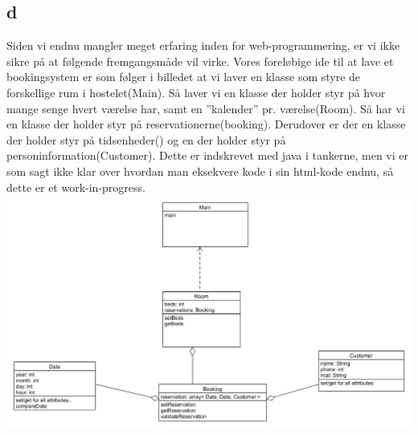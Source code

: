 \documentclass[12pt,a4paper]{article}
\begin{document}
\subsection{d}
Siden vi endnu mangler meget erfaring inden for web-programmering, er vi ikke sikre på at følgende fremgangsmåde vil virke. Vores foreløbige ide til at lave et bookingsystem er som følger i billedet at vi laver en klasse som styre de forskellige rum i hostelet(Main). Så laver vi en klasse der holder styr på hvor mange senge hvert værelse har, samt en ”kalender” pr. værelse(Room). Så har vi en klasse der holder styr på reservationerne(booking). Derudover er der en klasse der holder styr på tidsenheder() og en der holder styr på personinformation(Customer). Dette er indskrevet med java i tankerne, men vi er som sagt ikke klar over hvordan man eksekvere kode i sin html-kode endnu, så dette er et work-in-progress.\\
\includegraphics[scale=0.4]{unfinished.jpg}
\end{document}
